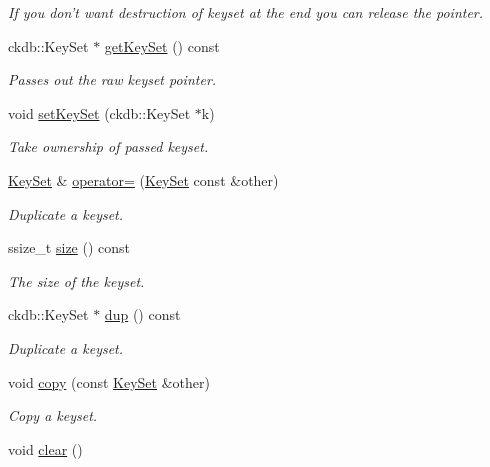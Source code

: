 \begin{DoxyCompactItemize}
\begin{DoxyCompactList}\small\item\em If you don't want destruction of keyset at the end you can release the pointer. \end{DoxyCompactList}\item 
ckdb\+::\+Key\+Set $\ast$ \hyperlink{classkdb_1_1KeySet_aa79bbbfb6e2f3e9c48cb3e595f9cda51}{get\+Key\+Set} () const 
\begin{DoxyCompactList}\small\item\em Passes out the raw keyset pointer. \end{DoxyCompactList}\item 
void \hyperlink{classkdb_1_1KeySet_a9f3ec4eebe304185527b08a6fa01b77c}{set\+Key\+Set} (ckdb\+::\+Key\+Set $\ast$k)
\begin{DoxyCompactList}\small\item\em Take ownership of passed keyset. \end{DoxyCompactList}\item 
\hyperlink{classkdb_1_1KeySet}{Key\+Set} \& \hyperlink{classkdb_1_1KeySet_a1c54736b7206bc2253d02a5bf4b3ccfb}{operator=} (\hyperlink{classkdb_1_1KeySet}{Key\+Set} const \&other)
\begin{DoxyCompactList}\small\item\em Duplicate a keyset. \end{DoxyCompactList}\item 
ssize\+\_\+t \hyperlink{classkdb_1_1KeySet_a18b332fe23a7f793f80f9b22b5727584}{size} () const 
\begin{DoxyCompactList}\small\item\em The size of the keyset. \end{DoxyCompactList}\item 
ckdb\+::\+Key\+Set $\ast$ \hyperlink{classkdb_1_1KeySet_a72d0b50194fb1900c468b53e749369a2}{dup} () const 
\begin{DoxyCompactList}\small\item\em Duplicate a keyset. \end{DoxyCompactList}\item 
void \hyperlink{classkdb_1_1KeySet_a28fd33fdaecf1d57d4dddac7058f5d38}{copy} (const \hyperlink{classkdb_1_1KeySet}{Key\+Set} \&other)
\begin{DoxyCompactList}\small\item\em Copy a keyset. \end{DoxyCompactList}\item 
void \hyperlink{classkdb_1_1KeySet_a38f5159e39758aa632421d2fe7440633}{clear} ()

\end{DoxyCompactItemize}
